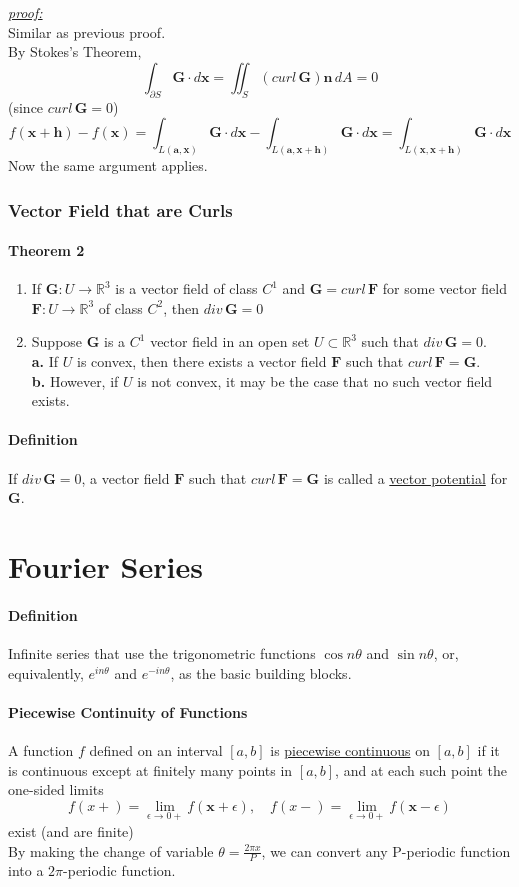 \documentclass[11pt]{article}
\newcommand{\tb}[1]{\textbf{#1}}
\newcommand{\real}[0]{\mathbb{R}}
\newcommand{\under}[1]{\underline{#1}}
\newcommand{\proof}[0]{\textit{\underline{proof:} }}
\newcommand{\vx}[0]{\tb{x}}
\newcommand{\va}[0]{\tb{a}}
\newcommand{\vf}[0]{\tb{F}}
\newcommand{\vg}[0]{\tb{G}}
\newcommand{\vn}[0]{\tb{n}}
\begin{document}
\noindent \proof \\
Similar as previous proof.\\
By Stokes's Theorem, $$\int_{\partial S}\vg \cdot d\vx = \iint_S(curl\, \vg)\vn \,dA = 0$$ (since $curl \,\vg = 0$)
$$f(\vx + \tb{h}) - f(\vx) = \int_{L(\va, \vx)}\vg\cdot d\vx - \int_{L(\va, \vx + \tb{h})} \vg \cdot d\vx = \int_{L(\vx,\vx+\tb{h})}\vg\cdot d\vx$$
Now the same argument applies.


\subsubsection{Vector Field that are Curls}
\paragraph{Theorem 2}
\begin{enumerate}
	\item If $\vg: U \rightarrow \real^3$ is a vector field of class $C^1$ and $\vg = curl\,\vf$ for some vector field $\vf: U \rightarrow \real^3$ of class $C^2$, then $div\,\vg = 0$
	\item Suppose $\vg$ is a $C^1$ vector field in an open set $U \subset \real^3$ such that $div \, \vg = 0$. \\
	\tb{a.} If $U$ is convex, then there exists a vector field $\vf$ such that $curl \, \vf = \vg$. \\
	\tb{b.} However, if $U$ is not convex, it may be the case that no such vector field exists.
\end{enumerate}
\paragraph{Definition} If $div \,\vg = 0$, a vector field $\vf$ such that $curl \,\vf = \vg$ is called a \under{vector potential} for $\vg$.




\section{Fourier Series}
\paragraph{Definition} Infinite series that use the trigonometric functions $\cos n\theta$ and $\sin n\theta$, or, equivalently, $e^{in\theta}$ and $e^{-in\theta}$, as the basic building blocks.
\paragraph{Piecewise Continuity of Functions} A function $f$ defined on an interval $[a,b]$ is \under{piecewise continuous} on $[a,b]$ if it is continuous except at finitely many points in $[a,b]$, and at each such point the one-sided limits
$$f(x+) = \underset{\epsilon \rightarrow 0+}{\lim} f(\vx + \epsilon), \quad f(x-)=\underset{\epsilon \rightarrow 0+}{\lim} f(\vx - \epsilon)$$
exist (and are finite)\\
By making the change of variable $\theta = \frac{2\pi x}{P}$, we can convert any P-periodic function into a $2\pi$-periodic function. 
\end{document}
